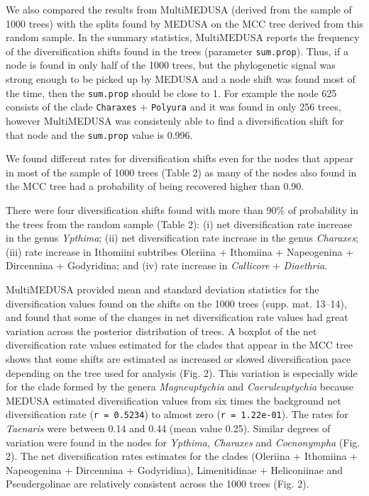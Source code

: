 \documentclass[10pt]{article}
\begin{document}
We also compared the results from MultiMEDUSA (derived from the sample
of 1000 trees) with the splits found by MEDUSA on the MCC tree derived
from this random sample. In the summary statistics, MultiMEDUSA reports
the frequency of the diversification shifts found in the trees
(parameter \texttt{sum.prop}). Thus, if a node is found in only half of
the 1000 trees, but the phylogenetic signal was strong enough to be
picked up by MEDUSA and a node shift was found most of the time, then
the \texttt{sum.prop} should be close to 1. For example the node 625
consists of the clade \texttt{Charaxes} + \texttt{Polyura} and it was
found in only 256 trees, however MultiMEDUSA was consistenly able to
find a diversification shift for that node and the \texttt{sum.prop}
value is 0.996.

We found different rates for diversification shifts even for the nodes
that appear in most of the sample of 1000 trees (Table 2) as many of the
nodes also found in the MCC tree had a probability of being recovered
higher than 0.90.

There were four diversification shifts found with more than 90\% of
probability in the trees from the random sample (Table 2): (i) net
diversification rate increase in the genus \emph{Ypthima}; (ii) net
diversification rate increase in the genus \emph{Charaxes}; (iii) rate
increase in Ithomiini subtribes Oleriina + Ithomiina + Napeogenina +
Dircennina + Godyridina; and (iv) rate increase in \emph{Callicore} +
\emph{Diaethria}.

MultiMEDUSA provided mean and standard deviation statistics for the
diversification values found on the shifts on the 1000 trees (supp. mat.
13--14), and found that some of the changes in net diversification rate
values had great variation across the posterior distribution of trees. A
boxplot of the net diversification rate values estimated for the clades
that appear in the MCC tree shows that some shifts are estimated as
increased or slowed diversification pace depending on the tree used for
analysis (Fig. 2). This variation is especially wide for the clade
formed by the genera \emph{Magneuptychia} and \emph{Caeruleuptychia}
because MEDUSA estimated diversification values from six times the
background net diversification rate (\texttt{r = 0.5234}) to almost zero
(\texttt{r = 1.22e-01}). The rates for \emph{Taenaris} were between 0.14
and 0.44 (mean value 0.25). Similar degrees of variation were found in
the nodes for \emph{Ypthima}, \emph{Charaxes} and \emph{Coenonympha}
(Fig. 2). The net diversification rates estimates for the clades
(Oleriina + Ithomiina + Napeogenina + Dircennina + Godyridina),
Limenitidinae + Heliconiinae and Pseudergolinae are relatively
consistent across the 1000 trees (Fig. 2).
\end{document}
